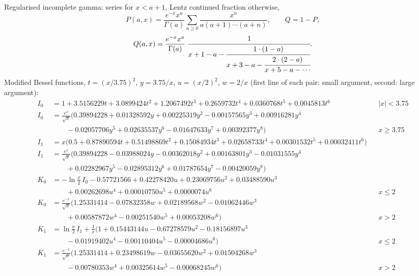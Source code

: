 \documentclass[11pt,a4paper]{article}
\begin{document}
Regularised incomplete gamma: series for $x<a+1$, Lentz continued fraction otherwise,
\begin{equation}
P(a,x) = \frac{e^{-x}x^a}{\Gamma(a)}\sum_{n\ge0}\frac{x^n}{a(a+1)\cdots(a+n)},\qquad Q = 1-P,
\end{equation}
\begin{equation}
Q(a,x) = \frac{e^{-x}x^a}{\Gamma(a)}\;\cfrac{1}{x+1-a-\cfrac{1\cdot(1-a)}{x+3-a-\cfrac{2\cdot(2-a)}{x+5-a-\cdots}}} .
\end{equation}
Modified Bessel functions, $t=(x/3.75)^2$, $y=3.75/x$, $u=(x/2)^2$, $w=2/x$
(first line of each pair: small argument, second: large argument):
{\footnotesize
\begin{align}
I_0 &= 1+3.5156229t+3.0899424t^2+1.2067492t^3+0.2659732t^4+0.0360768t^5+0.0045813t^6 && \scriptstyle |x|<3.75\nonumber\\
I_0 &= \tfrac{e^{x}}{\sqrt x}\big(0.39894228+0.01328592y+0.00225319y^2-0.00157565y^3+0.00916281y^4\nonumber\\
&\qquad -0.02057706y^5+0.02635537y^6-0.01647633y^7+0.00392377y^8\big) && \scriptstyle x\ge3.75\\[2pt]
I_1 &= x\big(0.5+0.87890594t+0.51498869t^2+0.15084934t^3+0.02658733t^4+0.00301532t^5+0.00032411t^6\big)\nonumber\\
I_1 &= \tfrac{e^{x}}{\sqrt x}\big(0.39894228-0.03988024y-0.00362018y^2+0.00163801y^3-0.01031555y^4\nonumber\\
&\qquad +0.02282967y^5-0.02895312y^6+0.01787654y^7-0.00420059y^8\big)\\[2pt]
K_0 &= -\ln\tfrac x2\,I_0 - 0.57721566+0.42278420u+0.23069756u^2+0.03488590u^3\nonumber\\
&\qquad +0.00262698u^4+0.00010750u^5+0.0000074u^6 && \scriptstyle x\le2\nonumber\\
K_0 &= \tfrac{e^{-x}}{\sqrt x}\big(1.25331414-0.07832358w+0.02189568w^2-0.01062446w^3\nonumber\\
&\qquad +0.00587872w^4-0.00251540w^5+0.00053208w^6\big) && \scriptstyle x>2\\[2pt]
K_1 &= \ln\tfrac x2\,I_1 + \tfrac1x\big(1+0.15443144u-0.67278579u^2-0.18156897u^3\nonumber\\
&\qquad -0.01919402u^4-0.00110404u^5-0.00004686u^6\big) && \scriptstyle x\le2\nonumber\\
K_1 &= \tfrac{e^{-x}}{\sqrt x}\big(1.25331414+0.23498619w-0.03655620w^2+0.01504268w^3\nonumber\\
&\qquad -0.00780353w^4+0.00325614w^5-0.00068245w^6\big) && \scriptstyle x>2
\end{align}}
\end{document}
